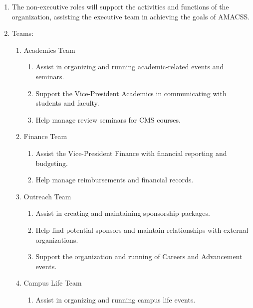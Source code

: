 \documentclass[12pt,a4paper]{article}
\begin{document}
\begin{enumerate}
\item The non-executive roles will support the activities and functions of the organization, assisting the executive team in achieving the goals of AMACSS.

\item Teams:

\begin{enumerate}
\item Academics Team

\begin{enumerate}
\item Assist in organizing and running academic-related events and seminars.

\item Support the Vice-President Academics in communicating with students and faculty.

\item Help manage review seminars for CMS courses.
\end{enumerate}

\item Finance Team

\begin{enumerate}
\item Assist the Vice-President Finance with financial reporting and budgeting.

\item Help manage reimbursements and financial records.
\end{enumerate}

\item Outreach Team

\begin{enumerate}
\item Assist in creating and maintaining sponsorship packages.

\item Help find potential sponsors and maintain relationships with external organizations.

\item Support the organization and running of Careers and Advancement events.
\end{enumerate}

\item Campus Life Team

\begin{enumerate}
\item Assist in organizing and running campus life events.


\end{enumerate}
\end{enumerate}
\end{enumerate}
\end{document}
